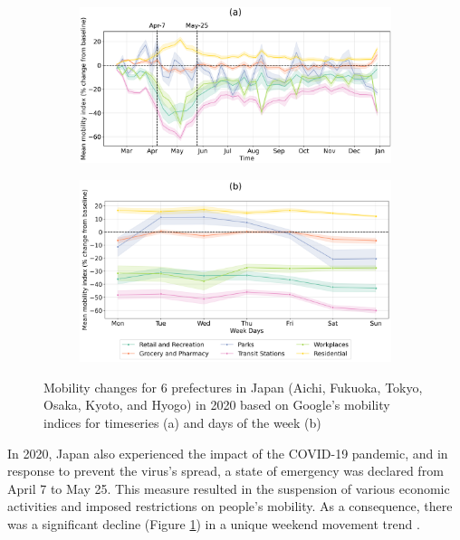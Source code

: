 \begin{figure}[tbh!]
    \centering
    \begin{subfigure}{\textwidth}
      \centering
      \includegraphics[width=\textwidth]{figs/chap4/fig1a_mobi_doy.png}
    \end{subfigure}

    \begin{subfigure}{\textwidth}
      \centering
      \includegraphics[width=\textwidth]{figs/chap4/fig1b_mobi_dow.png}
    \end{subfigure}
    \caption[Mobility changes for 6 prefectures in Japan]{Mobility changes for 6 prefectures in Japan (Aichi, Fukuoka, Tokyo, Osaka, Kyoto, and Hyogo) in 2020 based on Google’s mobility indices for timeseries (a) and days of the week (b)}
    \label{fig:chap4_fig1}
\end{figure}

In 2020, Japan also experienced the impact of the COVID-19 pandemic, and in response to prevent the virus's spread, a state of emergency was declared from April 7 to May 25. This measure resulted in the suspension of various economic activities and imposed restrictions on people's mobility. As a consequence, there was a significant decline (Figure \ref{fig:chap4_fig1}) in a unique weekend movement trend \citep{damiani2022peculiar}. \par

